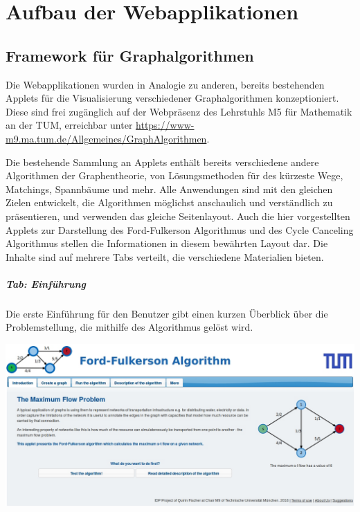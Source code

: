 \chapter{Aufbau der Webapplikationen}

\section{Framework für Graphalgorithmen}

Die Webapplikationen wurden in Analogie zu anderen, bereits bestehenden Applets für die Visualisierung verschiedener Graphalgorithmen konzeptioniert. Diese sind frei zugänglich auf der Webpräsenz des Lehrstuhls M5 für Mathematik an der TUM, erreichbar unter \href{https://www-m9.ma.tum.de/Allgemeines/GraphAlgorithmen}{https://www-m9.ma.tum.de/Allgemeines/GraphAlgorithmen}. 

Die bestehende Sammlung an Applets enthält bereits verschiedene andere Algorithmen der Graphentheorie, von Lösungsmethoden für des kürzeste Wege, Matchings, Spannbäume und mehr. Alle Anwendungen sind mit den gleichen Zielen entwickelt, die Algorithmen möglichst anschaulich und verständlich zu präsentieren, und verwenden das gleiche Seitenlayout. Auch die hier vorgestellten Applets zur Darstellung des Ford-Fulkerson Algorithmus und des Cycle Canceling Algorithmus stellen die Informationen in diesem bewährten Layout dar. Die Inhalte sind auf mehrere Tabs verteilt, die verschiedene Materialien bieten.

\paragraph{Tab: Einführung}

Die erste Einführung für den Benutzer gibt einen kurzen Überblick über die Problemstellung, die mithilfe des Algorithmus gelöst wird.
\begin{center}
\begin{minipage}[t]{0.80\textwidth}
    \includegraphics[width=\textwidth]{img/layout-1.jpg}
\end{minipage}
\end{center}
\vspace{1cm}

